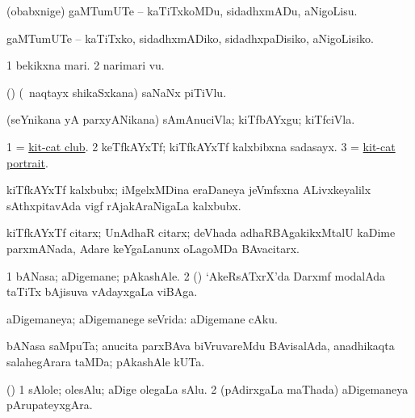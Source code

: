 \bentry
{}
\gl{\kirx}
\bmng
\emng

\noindent
\gl{\sakirx}
\bmng
(obabxnige) gaMTumUTe -- kaTiTxkoMDu, sidadhxmADu, aNigoLisu. 
\emng

\noindent
\gl{\akirx}
\bmng
gaMTumUTe -- kaTiTxko, sidadhxmADiko, sidadhxpaDisiko, aNigoLisiko. 
\emng
\eentry

\bentry
{}
\gl{\nA}
\bmng
\bnum
\num{1} bekikxna mari. 
\num{2} narimari \mo vu. 
\enum
\emng
\eentry

\bentry
{}
\gl{\nA}
\bmng
(\ca) (\kanmu\ naqtayx shikaSxkana) saNaNx piTiVlu. 
\emng
\eentry

\bentry
{}
\gl{\nA}
\bmng
(seYnikana yA parxyANikana) sAmAnuciVla; kiTfbAYxgu; kiTfciVla. 
\emng
\eentry

\bentry
{}
\gl{\nA}
\bmng
\bnum
\num{1}  = \hyperlink{kit-cat club}{kit-cat club}. 
\num{2} keTfkAYxTf; kiTfkAYxTf kalxbibxna sadasayx. 
\num{3}  = \hyperlink{kit-cat portrait}{kit-cat portrait}. 
\enum
\emng
\eentry

\bentry
{}
\gl{\nA}
\bmng
kiTfkAYxTf kalxbubx; iMgelxMDina eraDaneya jeVmfsxna ALivxkeyalilx sAthxpitavAda vigf rAjakAraNigaLa kalxbubx. 
\emng
\eentry

\bentry
{}
\gl{\nA}
\bmng
kiTfkAYxTf citarx; UnAdhaR citarx; deVhada adhaRBAgakikxMtalU kaDime parxmANada, Adare keYgaLanunx oLagoMDa BAvacitarx. 
\emng
\eentry

\bentry
{}
\gl{\nA}
\bmng
\bnum
\num{1} bANasa; aDigemane; pAkashAle. 
\num{2} (\ashi) `AkeRsATxrX'da Darxmf modalAda taTiTx bAjisuva vAdayxgaLa viBAga. 
\enum
\emng
\eentry

\bentry
{}
\gl{\gu}
\bmng
aDigemaneya; aDigemanege seVrida:  aDigemane cAku. 
\emng
\eentry

\bentry
{}
\gl{\nA}
\bmng
bANasa saMpuTa; anucita parxBAva biVruvareMdu BAvisalAda, anadhikaqta salahegArara taMDa; pAkashAle kUTa. 
\emng
\eentry

\bentry
{}
\gl{\nA}
\bmng
(\birx) 
\bnum
\num{1} sAlole; olesAlu; aDige olegaLa sAlu. 
\num{2} (pAdirxgaLa maThada) aDigemaneya pArupateyxgAra. 
\enum
\emng
\eentry

